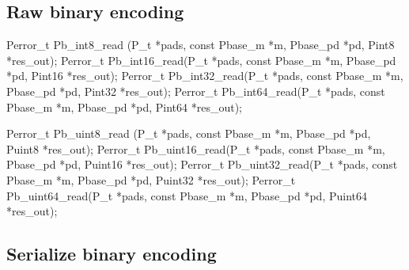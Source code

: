 \subsection{Raw binary encoding}

\bBegin{}
\bEnd{}

\begin{tinycodeaux}{\leftmargin=0in}
\codeallowbreaks
Perror_t Pb_int8_read (P_t *pads, const Pbase_m *m,
		       Pbase_pd *pd, Pint8 *res_out);
Perror_t Pb_int16_read(P_t *pads, const Pbase_m *m,
		       Pbase_pd *pd, Pint16 *res_out);
Perror_t Pb_int32_read(P_t *pads, const Pbase_m *m,
		       Pbase_pd *pd, Pint32 *res_out);
Perror_t Pb_int64_read(P_t *pads, const Pbase_m *m,
		       Pbase_pd *pd, Pint64 *res_out);

Perror_t Pb_uint8_read (P_t *pads, const Pbase_m *m,
			Pbase_pd *pd, Puint8 *res_out);
Perror_t Pb_uint16_read(P_t *pads, const Pbase_m *m,
			Pbase_pd *pd, Puint16 *res_out);
Perror_t Pb_uint32_read(P_t *pads, const Pbase_m *m,
			Pbase_pd *pd, Puint32 *res_out);
Perror_t Pb_uint64_read(P_t *pads, const Pbase_m *m,
			Pbase_pd *pd, Puint64 *res_out);
\end{tinycodeaux}

\subsection{Serialize binary encoding}

\sbBegin{}
\bEnd{}

